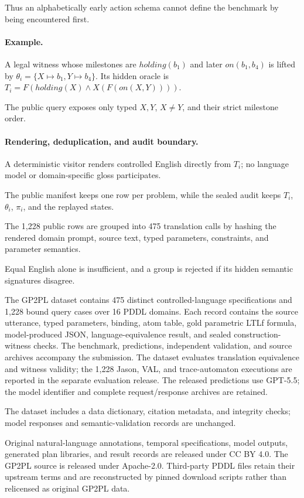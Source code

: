 Thus an alphabetically early action schema cannot define the benchmark by being
encountered first.

\paragraph{Example.}
A legal witness whose milestones are $\mathit{holding}(b_1)$ and later
$\mathit{on}(b_1,b_4)$ is lifted by
$\theta_i=\{X\mapsto b_1,Y\mapsto b_4\}$. Its hidden oracle is
$T_i=F(\mathit{holding}(X)\land X(F(\mathit{on}(X,Y))))$.

The public query exposes only typed $X,Y$, $X\ne Y$, and their strict milestone
order.

\paragraph{Rendering, deduplication, and audit boundary.}
A deterministic visitor renders controlled English directly from $T_i$; no
language model or domain-specific gloss participates.

The public manifest keeps one row per problem, while the sealed audit keeps
$T_i$, $\theta_i$, $\pi_i$, and the replayed states.

The 1,228 public rows are grouped into 475 translation calls by hashing the
rendered domain prompt, source text, typed parameters, constraints, and
parameter semantics.

Equal English alone is insufficient, and a group is rejected if its hidden
semantic signatures disagree.

The GP2PL dataset contains 475 distinct controlled-language specifications
and 1,228 bound query cases over 16 PDDL domains. Each record
contains the source utterance, typed parameters, binding, atom table, gold
parametric LTLf formula, model-produced JSON, language-equivalence result, and
sealed construction-witness checks. The benchmark, predictions, independent
validation, and source archives accompany the submission. The dataset evaluates
translation equivalence and witness validity; the 1,228 Jason, VAL, and
trace-automaton executions are reported in the separate evaluation release.
The released predictions use GPT-5.5; the model identifier and complete
request/response archives are retained.

The dataset includes a data dictionary, citation metadata, and integrity checks;
model responses and semantic-validation records are unchanged.

Original natural-language annotations, temporal specifications, model outputs,
generated plan libraries, and result records are released under CC BY 4.0. The
GP2PL source is released under Apache-2.0. Third-party PDDL files retain their
upstream terms and are reconstructed by pinned download scripts rather than
relicensed as original GP2PL data.

